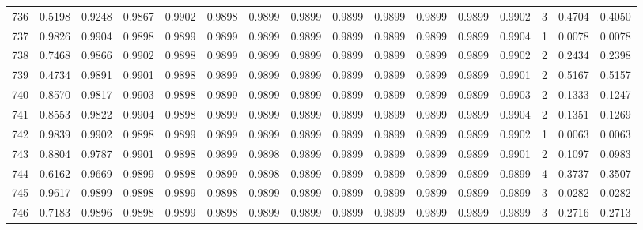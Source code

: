 \begin{tabular}{lrrrrrrrrrrrrrrr}
736 &      0.5198 &  0.9248 &  0.9867 &  0.9902 &  0.9898 &  0.9899 &  0.9899 &  0.9899 &  0.9899 &  0.9899 &   0.9899 &     0.9902 &      3 &                    0.4704 &                     0.4050 \\
737 &      0.9826 &  0.9904 &  0.9898 &  0.9899 &  0.9899 &  0.9899 &  0.9899 &  0.9899 &  0.9899 &  0.9899 &   0.9899 &     0.9904 &      1 &                    0.0078 &                     0.0078 \\
738 &      0.7468 &  0.9866 &  0.9902 &  0.9898 &  0.9899 &  0.9899 &  0.9899 &  0.9899 &  0.9899 &  0.9899 &   0.9899 &     0.9902 &      2 &                    0.2434 &                     0.2398 \\
739 &      0.4734 &  0.9891 &  0.9901 &  0.9898 &  0.9899 &  0.9899 &  0.9899 &  0.9899 &  0.9899 &  0.9899 &   0.9899 &     0.9901 &      2 &                    0.5167 &                     0.5157 \\
740 &      0.8570 &  0.9817 &  0.9903 &  0.9898 &  0.9899 &  0.9899 &  0.9899 &  0.9899 &  0.9899 &  0.9899 &   0.9899 &     0.9903 &      2 &                    0.1333 &                     0.1247 \\
741 &      0.8553 &  0.9822 &  0.9904 &  0.9898 &  0.9899 &  0.9899 &  0.9899 &  0.9899 &  0.9899 &  0.9899 &   0.9899 &     0.9904 &      2 &                    0.1351 &                     0.1269 \\
742 &      0.9839 &  0.9902 &  0.9898 &  0.9899 &  0.9899 &  0.9899 &  0.9899 &  0.9899 &  0.9899 &  0.9899 &   0.9899 &     0.9902 &      1 &                    0.0063 &                     0.0063 \\
743 &      0.8804 &  0.9787 &  0.9901 &  0.9898 &  0.9899 &  0.9898 &  0.9899 &  0.9899 &  0.9899 &  0.9899 &   0.9899 &     0.9901 &      2 &                    0.1097 &                     0.0983 \\
744 &      0.6162 &  0.9669 &  0.9899 &  0.9898 &  0.9899 &  0.9898 &  0.9899 &  0.9899 &  0.9899 &  0.9899 &   0.9899 &     0.9899 &      4 &                    0.3737 &                     0.3507 \\
745 &      0.9617 &  0.9899 &  0.9898 &  0.9899 &  0.9898 &  0.9899 &  0.9899 &  0.9899 &  0.9899 &  0.9899 &   0.9899 &     0.9899 &      3 &                    0.0282 &                     0.0282 \\
746 &      0.7183 &  0.9896 &  0.9898 &  0.9899 &  0.9898 &  0.9899 &  0.9899 &  0.9899 &  0.9899 &  0.9899 &   0.9899 &     0.9899 &      3 &                    0.2716 &                     0.2713 \\

\end{tabular}
